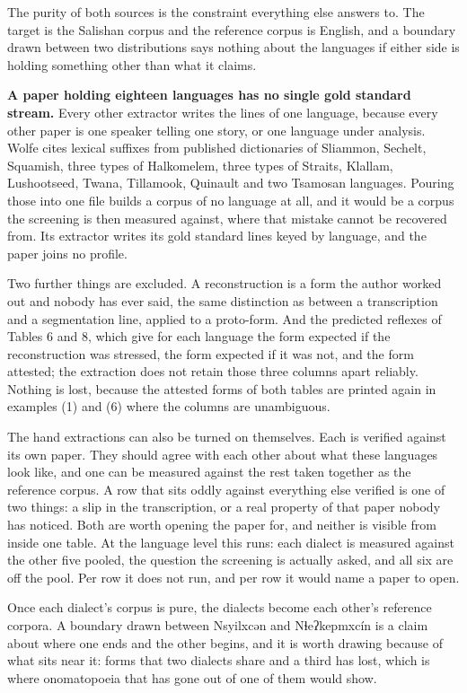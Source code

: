 The purity of both sources is the constraint everything else answers to. The target is the Salishan corpus and the reference corpus is English, and a boundary drawn between two distributions says nothing about the languages if either side is holding something other than what it claims.

\textbf{A paper holding eighteen languages has no single gold standard stream.} Every other extractor writes the lines of one language, because every other paper is one speaker telling one story, or one language under analysis. Wolfe cites lexical suffixes from published dictionaries of Sliammon, Sechelt, Squamish, three types of Halkomelem, three types of Straits, Klallam, Lushootseed, Twana, Tillamook, Quinault and two Tsamosan languages. Pouring those into one file builds a corpus of no language at all, and it would be a corpus the screening is then measured against, where that mistake cannot be recovered from. Its extractor writes its gold standard lines keyed by language, and the paper joins no profile.

Two further things are excluded. A reconstruction is a form the author worked out and nobody has ever said, the same distinction as between a transcription and a segmentation line, applied to a proto-form. And the predicted reflexes of Tables 6 and 8, which give for each language the form expected if the reconstruction was stressed, the form expected if it was not, and the form attested; the extraction does not retain those three columns apart reliably. Nothing is lost, because the attested forms of both tables are printed again in examples (1) and (6) where the columns are unambiguous.

The hand extractions can also be turned on themselves. Each is verified against its own paper. They should agree with each other about what these languages look like, and one can be measured against the rest taken together as the reference corpus. A row that sits oddly against everything else verified is one of two things: a slip in the transcription, or a real property of that paper nobody has noticed. Both are worth opening the paper for, and neither is visible from inside one table. At the language level this runs: each dialect is measured against the other five pooled, the question the screening is actually asked, and all six are off the pool. Per row it does not run, and per row it would name a paper to open.

Once each dialect's corpus is pure, the dialects become each other's reference corpora. A boundary drawn between Nsyilxcən and Nɬeʔkepmxcín is a claim about where one ends and the other begins, and it is worth drawing because of what sits near it: forms that two dialects share and a third has lost, which is where onomatopoeia that has gone out of one of them would show.

